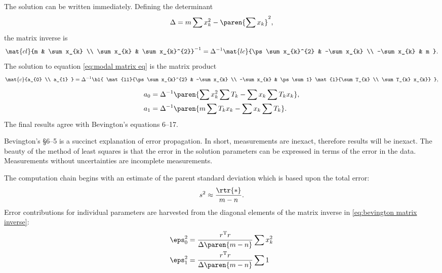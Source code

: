 The solution can be written immediately. Defining the determinant
  \begin{equation}   %
    \Delta = m \sum x_{k}^{2} - \paren{\sum x_{k}}^{2},
    \label{eq:det}
  \end{equation}
the matrix inverse is
  \begin{equation}   %
    \mat{cl}{m & \sum x_{k} \\ \sum x_{k} & \sum x_{k}^{2}}^{-1} = \Delta^{-1} 
    \mat{lc}{\ps \sum x_{k}^{2} & -\sum x_{k} \\ -\sum x_{k} & m } .
    \label{eq:bevington matrix inverse}
  \end{equation}
The solution to equation \eqref{eq:modal matrix eq} is the matrix product
  \begin{equation*}
    \mat{c}{a_{0} \\ a_{1} } = \Delta^{-1}
    \bl{
    \mat{ll}{\ps \sum x_{k}^{2} & -\sum x_{k} \\ -\sum x_{k} & \ps \sum 1}
    \mat{l}{\sum T_{k} \\ \sum T_{k} x_{k}}
    },
    \label{eqn:bevington solution product}
  \end{equation*}
  \begin{equation}
  \begin{split}
    a_{0} &= \Delta^{-1} \paren{\sum x_{k}^{2}\sum T_{k} - \sum x_{k}\sum T_{k} x_{k}}, \\
    a_{1} &= \Delta^{-1} \paren{m \sum T_{k} x_{k} - \sum x_{k}\sum T_{k}}.
  \label{eqn:bevington soln sum}
  \end{split}
  \end{equation}
The final results agree with Bevington's equations 6--17.

Bevington's \S 6--5 is a succinct explanation of error propagation. In short, measurements are inexact, therefore results will be inexact. The beauty of the method of least squares is that the error in the solution parameters can be expressed in terms of the error in the data. Measurements without uncertainties are incomplete measurements.

The computation chain begins with an estimate of the parent standard deviation which is based upon the total error:
  \begin{equation*}
    s^{2} \approx \frac{\rtr{*}} {m-n}.
  \end{equation*}
Error contributions for individual parameters are harvested from the diagonal elements of the matrix inverse in \eqref{eq:bevington matrix inverse}:
\begin{equation*}
  \begin{split}
    \eps_{0}^{2} &= \frac{r^{\mathrm{T}}r}{\Delta\paren{m-n}} \sum x_{k}^{2} \\
    \eps_{1}^{2} &= \frac{r^{\mathrm{T}}r}{\Delta\paren{m-n}} \sum 1 \\
  \end{split}
  \label{eqn:bevington error terms}
\end{equation*}
  
